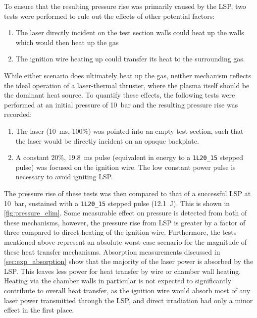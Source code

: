             
            To ensure that the resulting pressure rise was primarily caused by the LSP, two tests were performed to rule out the effects of other potential factors:
            \begin{enumerate}
                \item The laser directly incident on the test section walls could heat up the walls which would then heat up the gas
                \item The ignition wire heating up could transfer its heat to the surrounding gas.
            \end{enumerate}
            While either scenario does ultimately heat up the gas, neither mechanism reflects the ideal operation of a laser-thermal thruster, where the plasma itself should be the dominant heat source. To quantify these effects, the following tests were performed at an initial pressure of \qty{10}{bar} and the resulting pressure rise was recorded:
            \begin{enumerate}
                \item The laser (\qty{10}{ms}, 100\%) was pointed into an empty test section, such that the laser would be directly incident on an opaque backplate.
                \item A constant 20\%, \qty{19.8}{ms} pulse (equivalent in energy to a \texttt{1L20\_15} stepped pulse) was focused on the ignition wire. The low constant power pulse is necessary to avoid igniting LSP.
            \end{enumerate}
            The pressure rise of these tests was then compared to that of a successful LSP at \qty{10}{bar}, sustained with a \texttt{1L20\_15} stepped pulse (\qty{12.1}{J}). This is shown in \autoref{fig:pressure_elim}. Some measurable effect on pressure is detected from both of these mechanisms, however, the pressure rise from LSP is greater by a factor of three compared to direct heating of the ignition wire. Furthermore, the tests mentioned above represent an absolute worst-case scenario for the magnitude of these heat transfer mechanisms. Absorption measurements discussed in \autoref{sec:exp_absorption} show that the majority of the laser power is absorbed by the LSP. This leaves less power for heat transfer by wire or chamber wall heating. Heating via the chamber walls in particular is not expected to significantly contribute to overall heat transfer, as the ignition wire would absorb most of any laser power transmitted through the LSP, and direct irradiation had only a minor effect in the first place.

